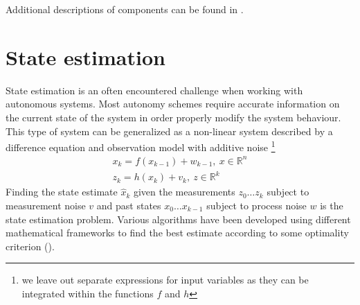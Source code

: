 \documentclass[times, utf8, diplomski, english]{fer}
\begin{document}
Additional descriptions of components can be found in .

\chapter{State estimation}\label{chapter:State estimation}
State estimation is an often encountered challenge when working with autonomous systems.
Most autonomy schemes require accurate information on the current state of the system in order properly modify the system behaviour.
This type of system can be generalized as a non-linear system described by a difference equation and observation model with additive noise \footnote{we leave out separate expressions for input variables as they can be integrated within the functions $f$ and $h$}
\begin{subequations}\label{eq:state_space_nl}
\begin{gather}
x_k = f\left(x_{k-1}\right) + w_{k-1} , \ x \in \mathbb{R}^n \\
z_k = h\left(x_k\right) + v_k, \ z \in \mathbb{R}^k
\end{gather}
\end{subequations}
Finding the state estimate $\hat{x}_k$ given the measurements $z_0 \dots z_k$ subject to measurement noise $v$ and past states $x_0 \dots x_{k-1}$ subject to process noise $w$ is the state estimation problem.
Various algorithms have been developed using different mathematical frameworks to find the best estimate according to some optimality criterion (\cite{thrun2005probabilistic}).  
\end{document}
